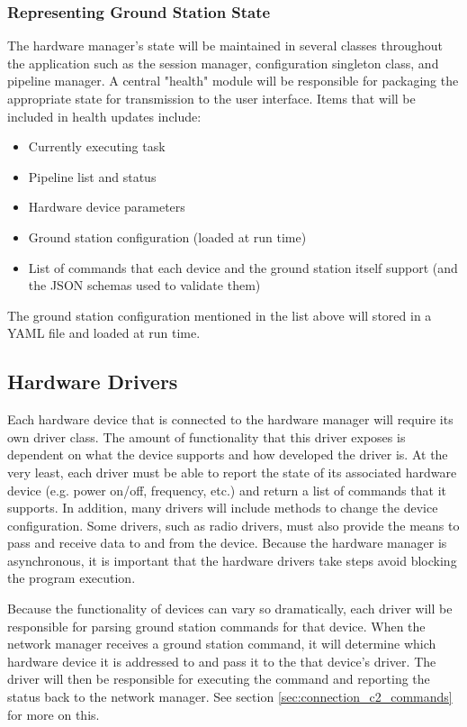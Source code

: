 \documentclass{mxl-design}
\begin{document}
\subsubsection{Representing Ground Station State}
\label{sec:state}
The hardware manager's state will be maintained in several classes throughout the application such as the session manager, configuration singleton class, and pipeline manager. A central "health" module will be responsible for packaging the appropriate state for transmission to the user interface. Items that will be included in health updates include:

\begin{itemize}
	\item Currently executing task
	\item Pipeline list and status
	\item Hardware device parameters
	\item Ground station configuration (loaded at run time)
	\item List of commands that each device and the ground station itself support (and the JSON schemas used to validate them)
\end{itemize}

The ground station configuration mentioned in the list above will stored in a YAML file and loaded at run time.

\subsection{Hardware Drivers}
\label{sec:drivers}
Each hardware device that is connected to the hardware manager will require its own driver class. The amount of functionality that this driver exposes is dependent on what the device supports and how developed the driver is. At the very least, each driver must be able to report the state of its associated hardware device (e.g. power on/off, frequency, etc.) and return a list of commands that it supports. In addition, many drivers will include methods to change the device configuration. Some drivers, such as radio drivers, must also provide the means to pass and receive data to and from the device. Because the hardware manager is asynchronous, it is important that the hardware drivers take steps avoid blocking the program execution.

Because the functionality of devices can vary so dramatically, each driver will be responsible for parsing ground station commands for that device. When the network manager receives a ground station command, it will determine which hardware device it is addressed to and pass it to the that device's driver. The driver will then be responsible for executing the command and reporting the status back to the network manager. See section \ref{sec:connection_c2_commands} for more on this.
\end{document}

